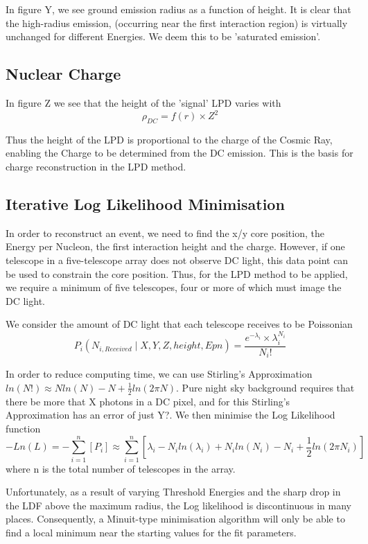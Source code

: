 \documentclass{article}
\begin{document}
In figure Y, we see ground emission radius as a function of height. It is clear that the high-radius emission, (occurring near the first interaction region) is virtually unchanged for different Energies. We deem this to be 'saturated emission'.

\subsection{Nuclear Charge}
In figure Z we see that the height of the 'signal' LPD varies with \[ \rho_{DC}  = f(r) \times Z^{2}\]

Thus the height of the LPD is proportional to the charge of the Cosmic Ray, enabling the Charge to be determined from the DC emission. This is the basis for charge reconstruction in the LPD method.

\subsection{Iterative Log Likelihood Minimisation}
In order to reconstruct an event, we need to find the x/y core position, the Energy per Nucleon, the first interaction height and the charge. However, if one telescope in a five-telescope array does not observe DC light, this data point can be used to constrain the core position. Thus, for the LPD method to be applied, we require a minimum of five telescopes, four or more of which must image the DC light.

We consider the amount of DC light that each telescope receives to be Poissonian \[  P_{i} ( N_{i, Received} \mid X, Y, Z, height, Epn )  =  \frac{ e^{- \lambda_{i} } \times \lambda_{i} ^{N_{i}} }{N_{i}!} \]

In order to reduce computing time, we can use Stirling's Approximation $ln( N! )  \approx  N ln(N) - N + \frac{1}{2} ln(2 \pi N)$. Pure night sky background requires that there be more that X photons in a DC pixel, and for this Stirling's Approximation has an error of just Y?. We then minimise the Log Likelihood function \[ - Ln(L) = - \sum_{i=1}^{n} [P_{i}] \approx  \sum_{i=1}^{n} [\lambda _{i} - N_{i} ln(\lambda _{i}) + N_{i} ln(N_{i}) - N_{i} + \frac{1}{2} ln(2 \pi N_{i})]  \]
where n is the total number of telescopes in the array.

Unfortunately, as a result of varying Threshold Energies and the sharp drop in the LDF above the maximum radius, the Log likelihood is discontinuous in many places. Consequently, a Minuit-type minimisation algorithm will only be able to find a local minimum near the starting values for the fit parameters.
\end{document}
